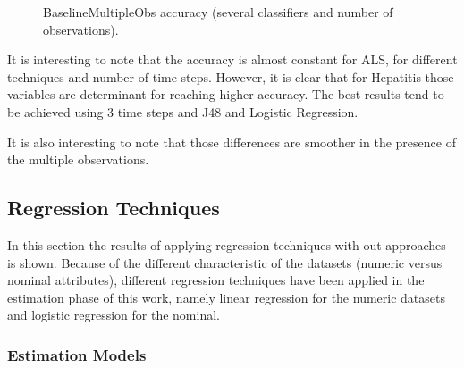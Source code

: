  \begin{figure}[h]
  \begin{subfigmatrix}{2}
  \end{subfigmatrix}
  \caption{BaselineMultipleObs accuracy (several classifiers and number of observations).}
  \label{fig:baselinemulti}
\end{figure}

It is interesting to note that the accuracy is almost constant for ALS, for different techniques and number of time steps. However, it is
clear that for Hepatitis those variables are determinant for reaching higher accuracy. The best results tend to be achieved using 3 time steps and 
J48 and Logistic Regression. 

It is also interesting to note that those differences are smoother in the presence of the multiple observations.

\subsection{Regression Techniques}
\label{subsection:regression}

In this section the results of applying regression techniques with out approaches is shown. Because of the different characteristic of the datasets (numeric versus nominal attributes), different regression techniques have been applied in the estimation phase of this work, namely linear regression for the numeric datasets and logistic regression for the nominal.
  
\subsubsection{Estimation Models}
\label{subsubsection:estimation_regression}

